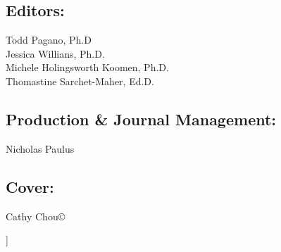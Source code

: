 \documentclass[11.5pt]{sig-alternate}
\begin{document}
\begin{large}
\begin{@twocolumnfalse}
\subsection*{Editors:}
Todd Pagano, Ph.D\\
Jessica Willians, Ph.D.\\
Michele Holingsworth Koomen, Ph.D.\\
Thomastine Sarchet-Maher, Ed.D.

\subsection*{Production \& Journal Management:}
Nicholas Paulus

\subsection*{Cover:}
Cathy Chou©
\end{@twocolumnfalse}]
\end{large}
\end{document}

